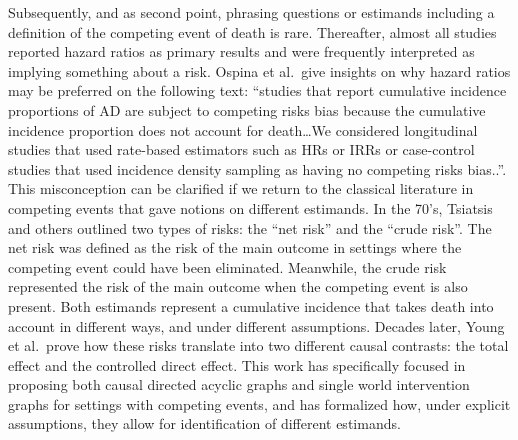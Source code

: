 \documentclass[
]{book}
\begin{document}
Subsequently, and as second point, phrasing questions or estimands including a definition of the competing event of death is rare. Thereafter, almost all studies reported hazard ratios as primary results and were frequently interpreted as implying something about a risk. Ospina et al.~give insights on why hazard ratios may be preferred on the following text: ``studies that report cumulative incidence proportions of AD are subject to competing risks bias because the cumulative incidence proportion does not account for death\ldots We considered longitudinal studies that used rate-based estimators such as HRs or IRRs or case-control studies that used incidence density sampling as having no competing risks bias..''. This misconception can be clarified if we return to the classical literature in competing events that gave notions on different estimands. In the 70's, Tsiatsis and others outlined two types of risks: the ``net risk'' and the ``crude risk''\autocite{tsiatsis1975,peterson1976}. The net risk was defined as the risk of the main outcome in settings where the competing event could have been eliminated. Meanwhile, the crude risk represented the risk of the main outcome when the competing event is also present. Both estimands represent a cumulative incidence that takes death into account in different ways, and under different assumptions. Decades later, Young et al.~prove how these risks translate into two different causal contrasts: the total effect and the controlled direct effect\autocite{young2020}. This work has specifically focused in proposing both causal directed acyclic graphs and single world intervention graphs for settings with competing events, and has formalized how, under explicit assumptions, they allow for identification of different estimands.
\end{document}
